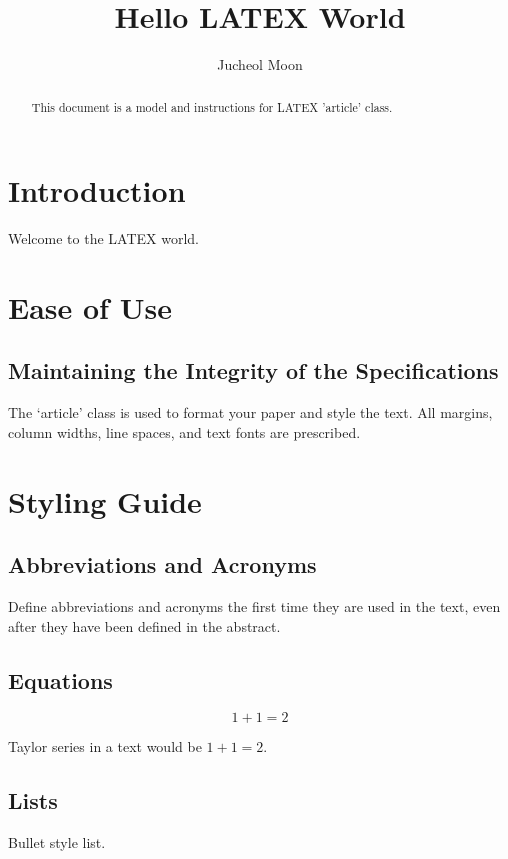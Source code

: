 \documentclass{article}
\begin{document}
\title{Hello LATEX World}

\author{Jucheol Moon}

\maketitle

\begin{abstract}
This document is a model and instructions for LATEX 'article' class.
\end{abstract}

\section{Introduction}
Welcome to the LATEX world.

\section{Ease of Use}

\subsection{Maintaining the Integrity of the Specifications}
The `article' class is used to format your paper and style the text. All margins, column widths, line spaces, and text fonts are prescribed.

\section{Styling Guide}

\subsection{Abbreviations and Acronyms}
Define abbreviations and acronyms the first time they are used in the text, 
even after they have been defined in the abstract.

\subsection{Equations}
\begin{equation}
1+1=2
\end{equation}

Taylor series in a text would be $1+1=2$.

\subsection{Lists}
Bullet style list.
\end{document}

